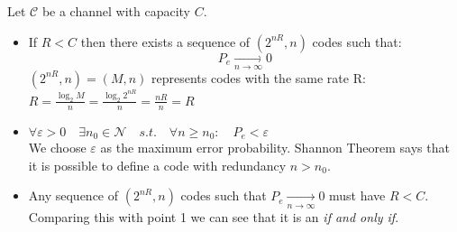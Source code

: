 \begin{thm}
	Let $\mathcal{C}$ be a channel with capacity $C$.
	\begin{itemize}
		\item If $R < C$ then there exists a sequence of $(2^{nR}, n)$ codes such that:
		$$P_e  \underset{n \rightarrow \infty}{\rightarrow} 0$$
		$(2^{nR}, n) = (M,n)$ represents codes with the same rate R: $R = \frac{\log_2 M}{n} = \frac{\log_2 2^{nR}}{n} = \frac{nR}{n} = R$ 
		
		\item $\forall \varepsilon > 0 \quad \exists n_0 \in \mathcal{N} \quad s.t. \quad \forall n \geq n_0:\quad P_e < \varepsilon$\\
		We choose $\varepsilon$ as the maximum error probability. Shannon Theorem says that it is possible to define a code with redundancy $n > n_0$.
		
		\item Any sequence of $(2^{nR}, n)$ codes such that $P_e  \underset{n \rightarrow \infty}{\rightarrow} 0$ must have $R < C$. Comparing this with point 1 we can see that it is an \textit{if and only if}. 
	\end{itemize}
\end{thm}
